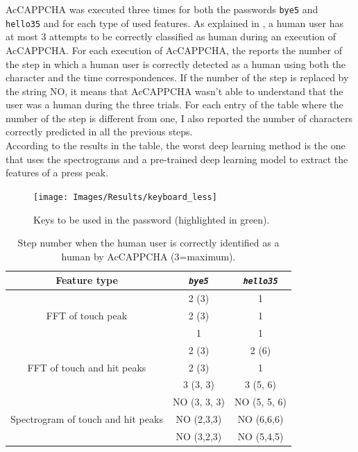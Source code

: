 AcCAPPCHA was executed three times for both the passwords \texttt{bye5} and \texttt{hello35} and for each type of used features. As explained in , a human user has at most 3 attempts to be correctly classified as human during an execution of AcCAPPCHA. For each execution of AcCAPPCHA, the  reports the number of the step in which a human user is correctly detected as a human using both the character and the time correspondences. If the number of the step is replaced by the string NO, it means that AcCAPPCHA wasn't able to understand that the user was a human during the three trials. For each entry of the table where the number of the step is different from one, I also reported the number of characters correctly predicted in all the previous steps.\\
According to the results in the table, the worst deep learning method is the one that uses the spectrograms and a pre-trained deep learning model to extract the features of a press peak.
\begin{figure}[H]
     \centering
	 \texttt{[image: Images/Results/keyboard\_less]}
     \caption{\footnotesize{Keys to be used in the password (highlighted in green).}}\label{Results:keyboard}
\end{figure}
\begin{table}[h]
\centering\footnotesize
\begin{tabular}{ccc}
\hline
{\textbf{Feature type}}&{\texttt{\textit{bye5}}}&{\texttt{\textit{hello35}}}\\
\hline
\multirow{3}{*}{FFT of touch peak} & {2 (3)} & {1}\\
& {2 (3)} & {1}\\
& {1} & {1}\\
\hline
\multirow{3}{*}{FFT of touch and hit peaks} & {2 (3)} & {2 (6)}\\
& {2 (3)} & {1}\\
& {3 (3, 3)} & {3 (5, 6)}\\
\hline
\multirow{3}{*}{Spectrogram of touch and hit peaks} & {NO (3, 3, 3)} & {NO (5, 5, 6)}\\
& {NO (2,3,3)} & {NO (6,6,6)}\\
& {NO (3,2,3)} & {NO (5,4,5)}\\
\hline
\end{tabular}
\caption{\footnotesize{Step number when the human user is correctly identified as a human by AcCAPPCHA (3=maximum).}}
\label{Results:verification}
\end{table}

